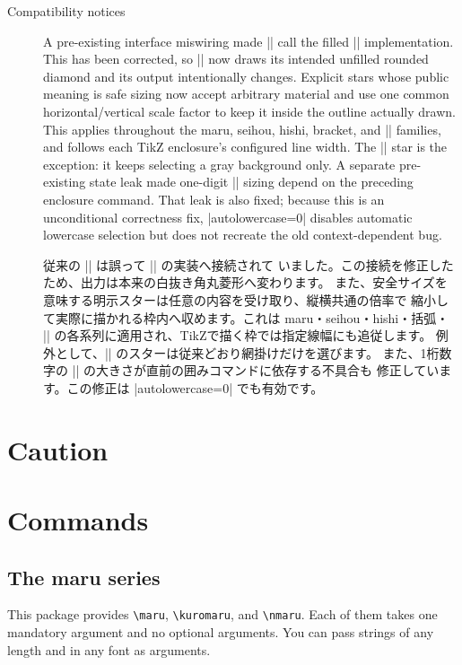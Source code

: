 \documentclass[luatex,fontsize=8pt,paper=b5,twoside]{jlreq}%
\begin{document}
\begin{description}
  \item[Compatibility notices] A pre-existing interface miswiring made
  \KKverb|\maruhishi| call the filled \KKverb|\kurohishi| implementation.
  This has been corrected, so \KKverb|\maruhishi| now draws its intended
  unfilled rounded diamond and its output intentionally changes. Explicit
  stars whose public meaning is safe sizing now accept arbitrary material and
  use one common horizontal/vertical scale factor to keep it inside the
  outline actually drawn. This applies throughout the maru, seihou, hishi,
  bracket, and \KKverb|\ichimoji| families, and follows each TikZ enclosure's
  configured line width. The \KKverb|\jegg| star is the exception: it keeps
  selecting a gray background only. A separate
  pre-existing state leak made one-digit \KKverb|\jegg*| sizing depend on the
  preceding enclosure command. That leak is also fixed; because this is an
  unconditional correctness fix, \KKverb|autolowercase=0| disables automatic
  lowercase selection but does not recreate the old context-dependent bug.

  従来の \KKverb|\maruhishi| は誤って \KKverb|\kurohishi| の実装へ接続されて
  いました。この接続を修正したため、出力は本来の白抜き角丸菱形へ変わります。
  また、安全サイズを意味する明示スターは任意の内容を受け取り、縦横共通の倍率で
  縮小して実際に描かれる枠内へ収めます。これは maru・seihou・hishi・括弧・
  \KKverb|\ichimoji| の各系列に適用され、TikZで描く枠では指定線幅にも追従します。
  例外として、\KKverb|\jegg| のスターは従来どおり網掛けだけを選びます。
  また、1桁数字の \KKverb|\jegg*| の大きさが直前の囲みコマンドに依存する不具合も
  修正しています。この修正は \KKverb|autolowercase=0| でも有効です。
\end{description}

\section{Caution}

\section{Commands}
\subsection{The maru series}
This package provides \verb|\maru|, \verb|\kuromaru|, and \verb|\nmaru|. Each of them takes one mandatory argument and no optional arguments. You can pass strings of any length and in any font as arguments.
\end{document}
